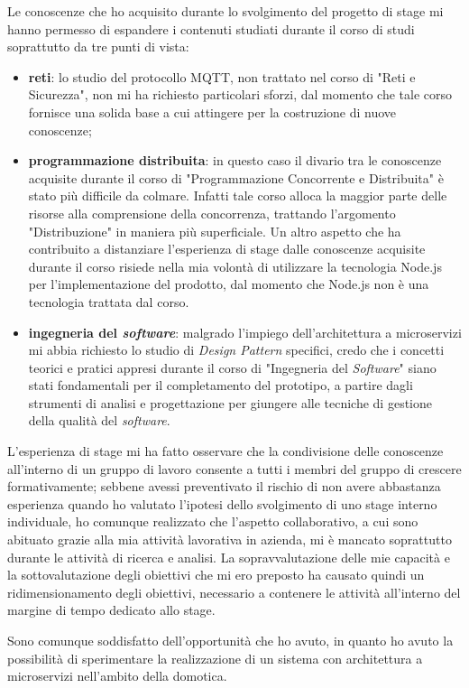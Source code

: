 Le conoscenze che ho acquisito durante lo svolgimento del progetto di stage mi hanno permesso di espandere i contenuti studiati durante il corso di studi soprattutto da tre punti di vista:
\begin{itemize}
  \item \textbf{reti}: lo studio del protocollo MQTT, non trattato nel corso di "Reti e Sicurezza", non mi ha richiesto particolari sforzi, dal momento che tale corso fornisce una solida base a cui attingere per la costruzione di nuove conoscenze;
  \item \textbf{programmazione distribuita}: in questo caso il divario tra le conoscenze acquisite durante il corso di "Programmazione Concorrente e Distribuita" è stato più difficile da colmare. Infatti tale corso alloca la maggior parte delle risorse alla comprensione della concorrenza, trattando l'argomento "Distribuzione" in maniera più superficiale. Un altro aspetto che ha contribuito a distanziare l'esperienza di stage dalle conoscenze acquisite durante il corso risiede nella mia volontà di utilizzare la tecnologia Node.js per l'implementazione del prodotto, dal momento che Node.js non è una tecnologia trattata dal corso.
  \item \textbf{ingegneria del \emph{software}}: malgrado l'impiego dell'architettura a microservizi mi abbia richiesto lo studio di \emph{Design Pattern} specifici, credo che i concetti teorici e pratici appresi durante il corso di "Ingegneria del \emph{Software}" siano stati fondamentali per il completamento del prototipo, a partire dagli strumenti di analisi e progettazione per giungere alle tecniche di gestione della qualità del \emph{software}.
\end{itemize}

L'esperienza di stage mi ha fatto osservare che la condivisione delle conoscenze all'interno di un gruppo di lavoro consente a tutti i membri del gruppo di crescere formativamente; sebbene avessi preventivato il rischio di non avere abbastanza esperienza quando ho valutato l'ipotesi dello svolgimento di uno stage interno individuale, ho comunque realizzato che l'aspetto collaborativo, a cui sono abituato grazie alla mia attività lavorativa in azienda, mi è mancato soprattutto durante le attività di ricerca e analisi. La sopravvalutazione delle mie capacità e la sottovalutazione degli obiettivi che mi ero preposto ha causato quindi un ridimensionamento degli obiettivi, necessario a contenere le attività all'interno del margine di tempo dedicato allo stage.

Sono comunque soddisfatto dell'opportunità che ho avuto, in quanto ho avuto la possibilità di sperimentare la realizzazione di un sistema con architettura a microservizi nell'ambito della domotica.
